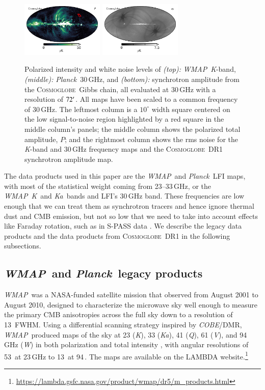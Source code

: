 \documentclass[twocolumn]{../../common/aa}
\def\WMAP{\emph{WMAP}}
\def\COBE{\emph{COBE}}
\def\Planck{\emph{Planck}}
\newcommand{\cosmoglobe}{\textsc{Cosmoglobe}}
\newcommand{\K}[0]{\textit K}
\newcommand{\Ka}[0]{\textit{Ka}}
\newcommand{\Q}[0]{\textit Q}
\newcommand{\V}[0]{\textit V}
\newcommand{\W}[0]{\textit W}
\begin{document}
\begin{figure}
	\includegraphics[width=0.35\textwidth]{figures/polint_CG.pdf}
	\includegraphics[width=0.35\textwidth]{figures/polint_CG_sigma.pdf}
	\caption{
		Polarized intensity and white noise levels of \textit{(top):} \WMAP\ \K-band, \textit{(middle):} \Planck\ 30\,GHz, and \textit{(bottom):} synchrotron amplitude from the \cosmoglobe\ Gibbs chain, all evaluated at 30\,GHz with a resolution of $72\arcm$. 
		All maps have been scaled to a common frequency of 30\,GHz.
		The leftmost column is a $10^\circ$ width square centered on the low signal-to-noise region highlighted by a red square in the middle column's panels; the middle column shows the polarized total amplitude, $P$; and the rightmost column shows the rms noise for the \K-band and 30\,GHz frequency maps and the \cosmoglobe\ DR1 synchrotron amplitude map.
		}
       \label{fig:synch_polint}
\end{figure}


The data products used in this paper are the \WMAP\ and \Planck\ LFI maps, with most of the statistical weight coming from 23--33\,GHz, or the \WMAP\ \K\ and \Ka\ bands and LFI's 30\,GHz band. These frequencies are low enough that we can treat them as synchrotron tracers and hence ignore thermal dust and CMB emission, but not so low that we need to take into account effects like Faraday rotation, such as in S-PASS data \citep{krachmalnicoff2018,fuskeland:2019}. We describe the legacy data products and the data products from \cosmoglobe\ DR1 in the following subsections.


\subsection{\WMAP\ and \Planck\ legacy products}
\label{sec:wmap_data}

\WMAP\ was a NASA-funded satellite mission that observed from August 2001 to August 2010, designed to characterize the microwave sky well enough to measure the primary CMB anisotropies across the full sky down to a resolution of 13\arcm\ FWHM. Using a differential scanning strategy inspired by \COBE/DMR,
\WMAP\ produced maps of the sky at 23 (\K), 33 (\Ka), 41 (\Q), 61 (\V), and 94\,GHz (\W) in both polarization and total intensity \citep{bennett2012}, with angular resolutions of 53\arcm\ at 23\,GHz to 13\arcm\ at 94\,\GHz. 
The maps are available on the LAMBDA website.\footnote{\url{https://lambda.gsfc.nasa.gov/product/wmap/dr5/m_products.html}} 
\end{document}

